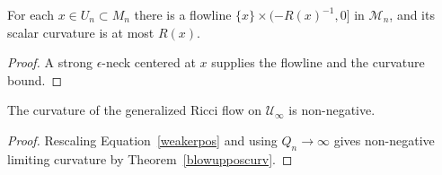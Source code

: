 \begin{claim}
\label{claim:flowline-exists-for-x}
For each $x\in U_n\subset M_n$ there is a flowline $\{x\}\times
(-R(x)^{-1},0]$ in ${\mathcal M}_n$, and its scalar curvature is at
most $R(x)$.
\end{claim}
\begin{proof}
\sketch A strong $\epsilon$-neck centered at $x$ supplies the flowline
and the curvature bound.
\end{proof}

\begin{claim}
\label{claim:limiting-flow-nonnegative-curvature}
The curvature of the generalized Ricci flow on ${\mathcal
U}_\infty$ is non-negative.
\end{claim}
\begin{proof}
\sketch Rescaling Equation~\ref{weakerpos} and using $Q_n\to\infty$
gives non-negative limiting curvature by Theorem~\ref{blowupposcurv}.
\end{proof}

